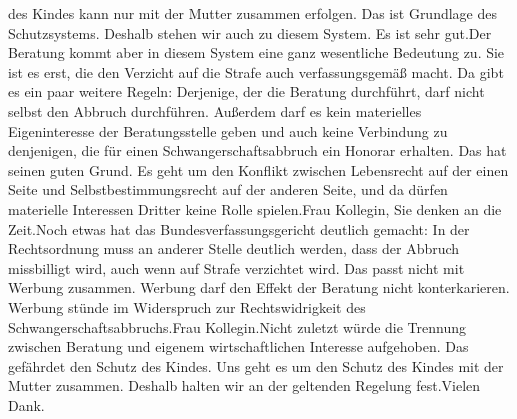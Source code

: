 \documentclass{article}
\begin{document}
des Kindes kann nur mit der Mutter zusammen erfolgen. Das ist Grundlage des Schutzsystems. Deshalb stehen wir auch zu diesem System. Es ist sehr gut.Der Beratung kommt aber in diesem System eine ganz wesentliche Bedeutung zu. Sie ist es erst, die den Verzicht auf die Strafe auch verfassungsgemäß macht. Da gibt es ein paar weitere Regeln: Derjenige, der die Beratung durchführt, darf nicht selbst den Abbruch durchführen. Außerdem darf es kein materielles Eigeninteresse der Beratungsstelle geben und auch keine Verbindung zu denjenigen, die für einen Schwangerschaftsabbruch ein Honorar erhalten. Das hat seinen guten Grund. Es geht um den Konflikt zwischen Lebensrecht auf der einen Seite und Selbstbestimmungsrecht auf der anderen Seite, und da dürfen materielle Interessen Dritter keine Rolle spielen.Frau Kollegin, Sie denken an die Zeit.Noch etwas hat das Bundesverfassungsgericht deutlich gemacht: In der Rechtsordnung muss an anderer Stelle deutlich werden, dass der Abbruch missbilligt wird, auch wenn auf Strafe verzichtet wird. Das passt nicht mit Werbung zusammen. Werbung darf den Effekt der Beratung nicht konterkarieren. Werbung stünde im Widerspruch zur Rechtswidrigkeit des Schwangerschaftsabbruchs.Frau Kollegin.Nicht zuletzt würde die Trennung zwischen Beratung und eigenem wirtschaftlichen Interesse aufgehoben. Das gefährdet den Schutz des Kindes. Uns geht es um den Schutz des Kindes mit der Mutter zusammen. Deshalb halten wir an der geltenden Regelung fest.Vielen Dank.
\end{document}

